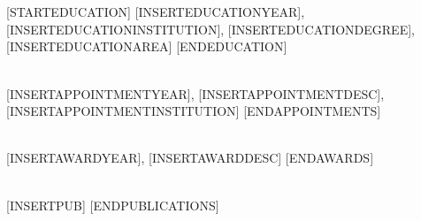 
\NameBoldface{\color{\NameColor}{\NameSize [INSERTNAME] ([INSERTROLE]):}}\\
[INSERTAFFILIATION]

\SectionSpacing
{}\\
[STARTEDUCATION]
[INSERTEDUCATIONYEAR], [INSERTEDUCATIONINSTITUTION], [INSERTEDUCATIONDEGREE], [INSERTEDUCATIONAREA]
[ENDEDUCATION]

\SectionSpacing
{}\\
[STARTAPPOINTMENTS]
[INSERTAPPOINTMENTYEAR], [INSERTAPPOINTMENTDESC], [INSERTAPPOINTMENTINSTITUTION]
[ENDAPPOINTMENTS]

\SectionSpacing
{}\\
[STARTAWARDS]
[INSERTAWARDYEAR], [INSERTAWARDDESC]
[ENDAWARDS]

\SectionSpacing
{}\\
[STARTPUBLICATIONS]
{\PublicationBullet}[INSERTPUB]
[ENDPUBLICATIONS]

